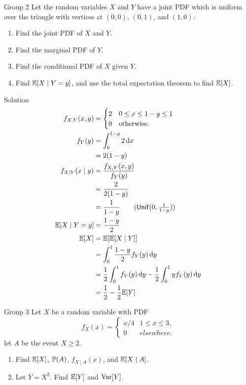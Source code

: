 \documentclass{article}
\begin{document}
\begin{problem}
    {Group 2}
    Let the random variables $X$ and $Y$ have a joint PDF which is uniform over the triangle with vertices at $(0, 0)$, $(0, 1)$, and $(1, 0)$.
    \begin{enumerate}
        \item Find the joint PDF of $X$ and $Y$.
        \item Find the marginal PDF of $Y$.
        \item Find the conditional PDF of $X$ given $Y$.
        \item Find $\condE{X}{Y = y}$, and use the total expectation theorem to find $\E{X}$.
    \end{enumerate}
\end{problem}

\begin{solution}
    {Solution}
    \begin{align*}
        f_{X,Y}(x,y) &= {
            \begin{cases}
                2 & 0 \leq x \leq 1-y \leq 1 \\
                0 & \text{otherwise.}
            \end{cases}
        } \\
        f_Y(y) &= \int_{0}^{1-y}2\diff x \\
        &= 2(1-y) \\
        f_{X\mid Y}(x\mid y) &= \frac{f_{X,Y}(x,y)}{f_Y(y)} \\
        &= \frac{2}{2(1-y)} \\
        &= \frac{1}{1-y} \tag{$\Unif(0,\frac{1}{1-y})$}\\
        \condE{X}{Y=y} &= \frac{1-y}{2} \\
        \E{X} &= \E{\condE{X}{Y}} \\
        &= \int_{0}^{1}\frac{1-y}{2}f_Y{(y)}\diff y \\
        &= \frac{1}{2}\int_{0}^{1}f_Y(y)\diff y - \frac{1}{2}\int_{0}^{1}yf_Y(y)\diff y\\
        &= \frac{1}{2}-\frac{1}{2}\E{Y} \\
    \end{align*}
\end{solution}

\begin{problem}
    {Group 3}
    Let $X$ be a random variable with PDF
    \[
        f_X(x) = {
            \begin{cases}
                x/4 & 1 \leq x \leq 3,\\
                0 & elsewhere.
            \end{cases}
        }
    \]
    let $A$ be the event ${X \geq 2}$.
    \begin{enumerate}
        \item Find $\E{X}$, $\P{A}$, $f_{X\mid A}(x)$, and $\E{X \mid A}$.
        \item Let $Y = X^2$. Find $\E{Y}$ and $\mathop{\mathrm{Var}}\nolimits[Y]$.
    \end{enumerate}
\end{problem}
\end{document}
